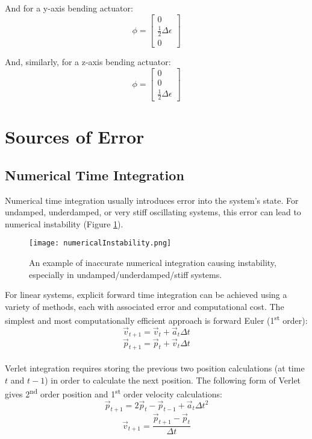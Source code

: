 {And for a y-axis bending actuator:
\[ \phi = \left[ \begin{array}{ccc}
0\\
\tfrac{1}{2}\Delta\epsilon\\
0
 \end{array} \right]
\]

And, similarly, for a z-axis bending actuator:
\[ \phi = \left[ \begin{array}{ccc}
0\\
0\\
\tfrac{1}{2}\Delta\epsilon
 \end{array} \right]
\]

\section{Sources of Error}

\subsection{Numerical Time Integration}

Numerical time integration usually introduces error into the system's state.  For undamped, underdamped, or very stiff oscillating systems, this error can lead to numerical instability (Figure \ref{fig:numericalInstability}).\\

\begin{figure}
  \texttt{[image: numericalInstability.png]}
  \caption{An example of inaccurate numerical integration causing instability, especially in undamped/underdamped/stiff systems.}
  \label{fig:numericalInstability}
\end{figure}

For linear systems, explicit forward time integration can be achieved using a variety of methods, each with associated error and computational cost.  The simplest and most computationally efficient approach is forward Euler (1\textsuperscript{st} order):
\[ \vec{v}_{t+1} = \vec{v}_{t} +  \vec{a}_{t}\Delta t\]
\[ \vec{p}_{t+1} = \vec{p}_{t} +  \vec{v}_{t}\Delta t\]\\

Verlet integration requires storing the previous two position calculations (at time $t$ and $t-1$) in order to calculate the next position.  The following form of Verlet gives 2\textsuperscript{nd} order position and 1\textsuperscript{st} order velocity calculations:
\[ \vec{p}_{t+1} = 2\vec{p}_{t} - \vec{p}_{t-1} +  \vec{a}_{t}\Delta t^2\]
\[ \vec{v}_{t+1} = \dfrac{\vec{p}_{t+1} - \vec{p}_{t}}{\Delta t}\]\\

}
